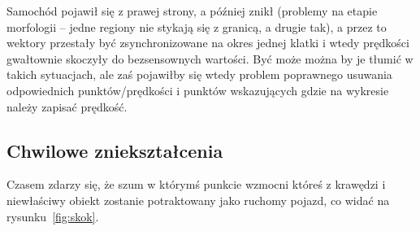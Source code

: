 \documentclass[11pt, a4paper]{article}
\begin{document}
Samochód pojawił się z prawej strony, a później znikł (problemy na etapie morfologii -- jedne regiony nie stykają się z granicą, a drugie tak), a przez to wektory przestały być zsynchronizowane na okres jednej klatki i wtedy prędkości gwałtownie skoczyły do bezsensownych wartości. Być może można by je tłumić w takich sytuacjach, ale zaś pojawiłby się wtedy problem poprawnego usuwania odpowiednich punktów/prędkości i punktów wskazujących gdzie na wykresie należy zapisać prędkość.

\subsection*{Chwilowe zniekształcenia}

Czasem zdarzy się, że szum w którymś punkcie wzmocni któreś z krawędzi i niewłaściwy obiekt zostanie potraktowany jako ruchomy pojazd, co widać na rysunku~\ref{fig:skok}.
\end{document}
